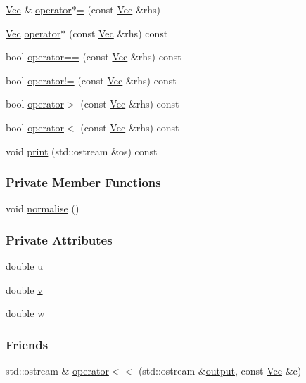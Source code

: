 \begin{DoxyCompactItemize}
\item 
\hyperlink{classVec}{\-Vec} \& \hyperlink{classVec_a92804048dd925bba0d301dd93a28bd8f}{operator$\ast$=} (const \hyperlink{classVec}{\-Vec} \&rhs)
\item 
\hyperlink{classVec}{\-Vec} \hyperlink{classVec_ab630eb05f7f84ac9ccbb3fbce5e30e62}{operator$\ast$} (const \hyperlink{classVec}{\-Vec} \&rhs) const 
\item 
bool \hyperlink{classVec_a490ee432f3b43cce76d59e8d1aa6c66f}{operator==} (const \hyperlink{classVec}{\-Vec} \&rhs) const 
\item 
bool \hyperlink{classVec_a6c7f02ea2f4ae67c36f0aeb1ac97d027}{operator!=} (const \hyperlink{classVec}{\-Vec} \&rhs) const 
\item 
bool \hyperlink{classVec_a48553775073fb23a0427db27b7d9e5cf}{operator$>$} (const \hyperlink{classVec}{\-Vec} \&rhs) const 
\item 
bool \hyperlink{classVec_ac3708104626d0d23e6643d960185deb7}{operator$<$} (const \hyperlink{classVec}{\-Vec} \&rhs) const 
\item 
void \hyperlink{classVec_ae7b64d21bc832137b2c2bb1e8c30c0b2}{print} (std\-::ostream \&os) const 
\end{DoxyCompactItemize}
\subsubsection*{\-Private \-Member \-Functions}
\begin{DoxyCompactItemize}
\item 
void \hyperlink{classVec_af5ed89da3d66bddb87c55c1d9d70baa4}{normalise} ()
\end{DoxyCompactItemize}
\subsubsection*{\-Private \-Attributes}
\begin{DoxyCompactItemize}
\item 
double \hyperlink{classVec_a463e55879d386da7c31644446a9aba13}{u}
\item 
double \hyperlink{classVec_a171bde0822311dc8f9ec69e1e90ba2ff}{v}
\item 
double \hyperlink{classVec_a4e475b48393d5d8f6e1837e2007454b8}{w}
\end{DoxyCompactItemize}
\subsubsection*{\-Friends}
\begin{DoxyCompactItemize}
\item 
std\-::ostream \& \hyperlink{classVec_ad50f5245c27f0120ffe35834b5bd28d4}{operator$<$$<$} (std\-::ostream \&\hyperlink{MappedSPSamplingTest_8cpp_a91337b8216794ab4371528e4d8f07aa2}{output}, const \hyperlink{classVec}{\-Vec} \&c)
\end{DoxyCompactItemize}


